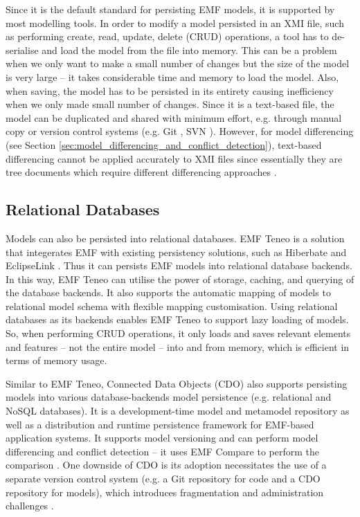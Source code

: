 Since it is the default standard for persisting EMF models, it is supported by  most modelling tools. In order to modify a model persisted in an XMI file, such as performing create, read, update, delete (CRUD) operations, a tool has to de-serialise and load the model from the file into memory. This can be a problem when we only want to make a small number of changes but the size of the model is very large -- it takes considerable time and memory to load the model. Also, when saving, the model has to be persisted in its entirety causing inefficiency when we only made small number of changes. Since it is a text-based file, the model can be duplicated and shared with minimum effort, e.g. through manual copy or version control systems (e.g. Git \cite{git2019about}, SVN \cite{apache2019svn}). However, for model differencing (see Section \ref{sec:model_differencing_and_conflict_detection}), text-based differencing \cite{DBLP:journals/algorithmica/Meyers86} cannot be applied accurately to XMI files since essentially they are tree documents which require different differencing approaches \cite{wang2003xdiff}.

\subsection{Relational Databases}
\label{sec:relational_databases}
Models can also be persisted into relational databases. EMF Teneo \cite{eclipse2017teneo} is a solution that integerates EMF with existing persistency solutions, such as Hiberbate \cite{hibernate2019hibernateorm} and EclipseLink \cite{eclipse2019eclipselink}. Thus it can persists EMF models into relational database backends. In this way, EMF Teneo can utilise the power of storage, caching, and querying of the database backends. It also supports the automatic mapping of models to relational model schema with flexible mapping customisation. Using relational databases as its backends enables EMF Teneo to support lazy loading of models. So, when performing CRUD operations, it only loads and saves relevant elements and features -- not the entire model -- into and from memory, which is efficient in terms of memory usage.

Similar to EMF Teneo, Connected Data Objects (CDO) \cite{eclipse2019cdo} also supports persisting models into various database-backends model persistence (e.g. relational and NoSQL databases). It is a development-time model and metamodel repository as well as a distribution and runtime persistence framework for EMF-based application systems. It supports model versioning and can perform model differencing and conflict detection -- it uses EMF Compare \cite{emfcompare2018developer} to perform the comparison \cite{cdo2019emfcompare}. One downside of CDO is its adoption necessitates the use of a separate version control system (e.g. a Git repository for code and a CDO repository for models), which introduces fragmentation and administration challenges \cite{barmpis2014evaluation}.

